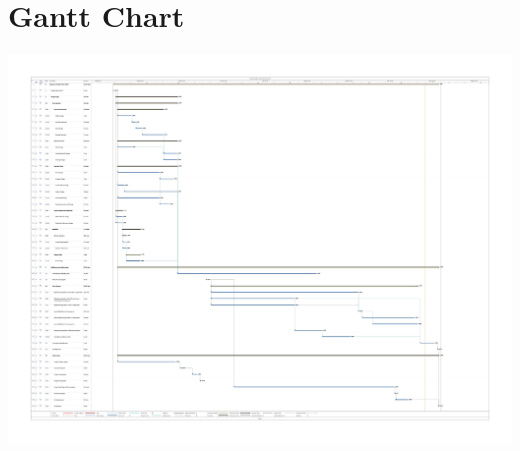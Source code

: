 \section{Gantt Chart} \label{gantt}
\begin{minipage}{\linewidth}
\includegraphics[width=\linewidth]{images/Gantt_Chart_Capstone_Project_Group2_Rev5.pdf}
\label{fig:gantt}
\end{minipage}
